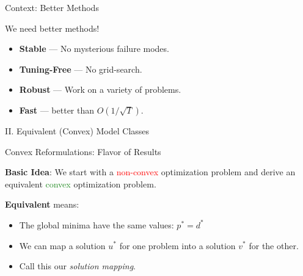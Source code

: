 \documentclass[usenames,dvipsnames,mathserif,notheorems]{beamer}
\newcommand{\red}[1]{\textcolor{Red}{#1}}
\newcommand{\green}[1]{\textcolor{ForestGreen}{#1}}
\begin{document}
\begin{frame}{Context: Better Methods}
	\begin{center}
		{ \Large
			We need better methods!
		}

	\end{center}
	\vspace{1em}
	\pause

	\begin{itemize}
		\item \textbf{Stable} --- No mysterious failure modes.\pause

		      \vspace{0.5em}
		\item \textbf{Tuning-Free} --- No grid-search.\pause

		      \vspace{0.5em}
		\item \textbf{Robust} --- Work on a variety of problems.\pause

		      \vspace{0.5em}
		\item \textbf{Fast} --- better than \( O(1/\sqrt{T}) \).
	\end{itemize}
\end{frame}



\begin{frame}{}
	\begin{center}
		\huge II. Equivalent (Convex) Model Classes
	\end{center}
\end{frame}

\begin{frame}{Convex Reformulations: Flavor of Results}

	{ \large
		\textbf{Basic Idea}: We start with a \red{non-convex} optimization problem and derive
		an equivalent \green{convex} optimization problem.
	}

	\pause
	\vspace{2em}

	\textbf{Equivalent} means:
	\vspace{0.5em}
	\begin{itemize}
		\item The global minima have the same values: \( p^* = d^* \)
		      \vspace{0.5em}
		\item We can map a solution \( u^* \) for one problem into a solution
		      \( v^* \) for the other.
		      \vspace{0.5em}
		\item Call this our \emph{solution mapping}.
	\end{itemize}

\end{frame}
\end{document}
